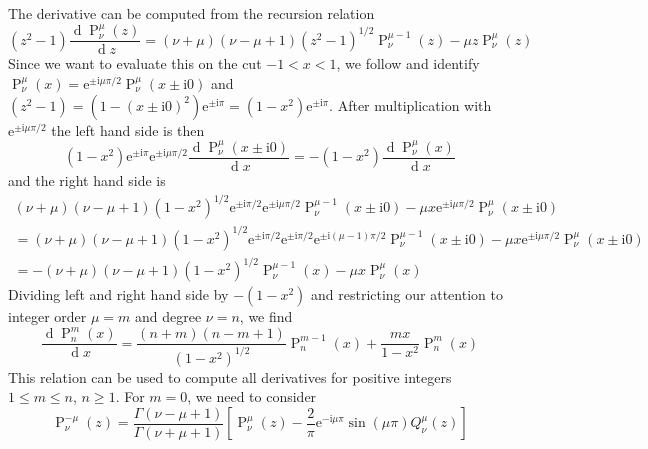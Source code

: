 \documentclass[a4paper,12pt]{article}
\newcommand{\mrm}[1]{\mathrm{#1}}
\newcommand{\diff}{\operatorname{d}\!}
\newcommand{\iu}{\mrm{i}}
\newcommand{\eu}{\mrm{e}}
\begin{document}
\begin{itemize}
  The derivative can be computed from the recursion relation
  \cite[8.5.2]{Abramowitz+Stegun1970}
  \begin{equation}
    (z^{2}-1)\frac{\diff\operatorname{P}_{\nu}^{\mu}(z)}{\diff z} = (\nu+\mu)(\nu-\mu+1)(z^{2}-1)^{1/2}\operatorname{P}_{\nu}^{\mu-1}(z) - \mu z\operatorname{P}_{\nu}^{\mu}(z)
  \end{equation}
  Since we want to evaluate this on the cut $-1<x<1$, we follow
  \cite[8.3.2 and 8.3.4]{Abramowitz+Stegun1970} and identify
  $\operatorname{P}_{\nu}^{\mu}(x) =
  \eu^{\pm\iu\mu\pi/2}\operatorname{P}_{\nu}^{\mu}(x\pm\iu0)$ and
  $(z^{2}-1) = (1-(x\pm\iu0)^{2})\eu^{\pm\iu\pi} =
  (1-x^{2})\eu^{\pm\iu\pi}$. After multiplication with
  $\eu^{\pm\iu\mu\pi/2}$ the left hand side is then
  \begin{equation}
    (1-x^{2})\eu^{\pm\iu\pi}\eu^{\pm\iu\mu\pi/2}\frac{\diff\operatorname{P}_{\nu}^{\mu}(x\pm\iu0)}{\diff x} = -(1-x^{2})\frac{\diff\operatorname{P}_{\nu}^{\mu}(x)}{\diff x}
  \end{equation}
  and the right hand side is
  \begin{multline}
    (\nu+\mu)(\nu-\mu+1)(1-x^{2})^{1/2}\eu^{\pm\iu\pi/2}\eu^{\pm\iu\mu\pi/2}\operatorname{P}_{\nu}^{\mu-1}(x\pm\iu0) - \mu x\eu^{\pm\iu\mu\pi/2}\operatorname{P}_{\nu}^{\mu}(x\pm\iu0) \\
    = (\nu+\mu)(\nu-\mu+1)(1-x^{2})^{1/2}\eu^{\pm\iu\pi/2}\eu^{\pm\iu\pi/2}\eu^{\pm\iu(\mu-1)\pi/2}\operatorname{P}_{\nu}^{\mu-1}(x\pm\iu0) - \mu x\eu^{\pm\iu\mu\pi/2}\operatorname{P}_{\nu}^{\mu}(x\pm\iu0) \\
    = - (\nu+\mu)(\nu-\mu+1)(1-x^{2})^{1/2}\operatorname{P}_{\nu}^{\mu-1}(x) - \mu x\operatorname{P}_{\nu}^{\mu}(x) 
  \end{multline}
  Dividing left and right hand side by $-(1-x^{2})$ and restricting
  our attention to integer order $\mu=m$ and degree $\nu=n$, we find
  \begin{equation}
    \frac{\diff\operatorname{P}_{n}^{m}(x)}{\diff x} = \frac{(n+m)(n-m+1)}{(1-x^{2})^{1/2}}\operatorname{P}_{n}^{m-1}(x) + \frac{mx}{1-x^{2}}\operatorname{P}_{n}^{m}(x)
  \end{equation}
  This relation can be used to compute all derivatives for positive
  integers $1\leq m\leq n$, $n\geq1$. For $m=0$, we need to consider
  \cite[8.2.5]{Abramowitz+Stegun1970}
  \begin{equation}
    \operatorname{P}_{\nu}^{-\mu}(z) = \frac{\Gamma(\nu-\mu+1)}{\Gamma(\nu+\mu+1)}\left[ \operatorname{P}_{\nu}^{\mu}(z) - \frac{2}{\pi}\eu^{-\iu\mu\pi}\sin(\mu\pi)Q_{\nu}^{\mu}(z)\right]

\end{equation}
\end{itemize}
\end{document}
